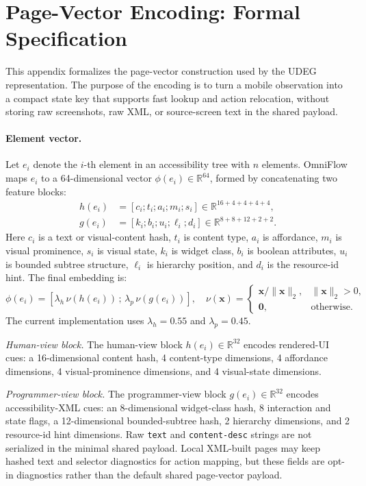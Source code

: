 
\section{Page-Vector Encoding: Formal Specification}
\label{app:pvs-encoding}

This appendix formalizes the page-vector construction used by the UDEG
representation.  The purpose of the encoding is to turn a mobile observation
into a compact state key that supports fast lookup and action relocation,
without storing raw screenshots, raw XML, or source-screen text in the shared
payload.

\paragraph{Element vector.}
Let $e_i$ denote the $i$-th element in an accessibility tree with $n$ elements.
OmniFlow maps $e_i$ to a 64-dimensional vector
$\phi(e_i) \in \mathbb{R}^{64}$, formed by concatenating two feature blocks:
\[
\begin{aligned}
  h(e_i) &= [c_i;t_i;a_i;m_i;s_i] \in
  \mathbb{R}^{16+4+4+4+4},\\
  g(e_i) &= [k_i;b_i;u_i;\ell_i;d_i] \in
  \mathbb{R}^{8+8+12+2+2}.
\end{aligned}
\]
Here $c_i$ is a text or visual-content hash, $t_i$ is content type, $a_i$ is
affordance, $m_i$ is visual prominence, $s_i$ is visual state, $k_i$ is widget
class, $b_i$ is boolean attributes, $u_i$ is bounded subtree structure,
$\ell_i$ is hierarchy position, and $d_i$ is the resource-id hint.  The final
embedding is:
\[
  \phi(e_i)=
  [\lambda_h\,\nu(h(e_i)) \,;\, \lambda_p\,\nu(g(e_i))],
  \quad
  \nu(\mathbf{x})=
  \begin{cases}
    \mathbf{x}/\|\mathbf{x}\|_2, & \|\mathbf{x}\|_2>0,\\
    \mathbf{0}, & \text{otherwise}.
  \end{cases}
\]
The current implementation uses $\lambda_h=0.55$ and $\lambda_p=0.45$.

\emph{Human-view block.}
The human-view block $h(e_i) \in \mathbb{R}^{32}$ encodes rendered-UI cues:
a 16-dimensional content hash, 4 content-type dimensions, 4 affordance
dimensions, 4 visual-prominence dimensions, and 4 visual-state dimensions.

\emph{Programmer-view block.}
The programmer-view block $g(e_i) \in \mathbb{R}^{32}$ encodes
accessibility-XML cues: an 8-dimensional widget-class hash, 8 interaction and
state flags, a 12-dimensional bounded-subtree hash, 2 hierarchy dimensions,
and 2 resource-id hint dimensions.  Raw \texttt{text} and
\texttt{content-desc} strings are not serialized in the minimal shared
payload.  Local XML-built pages may keep hashed text and selector diagnostics
for action mapping, but these fields are opt-in diagnostics rather than the
default shared page-vector payload.

